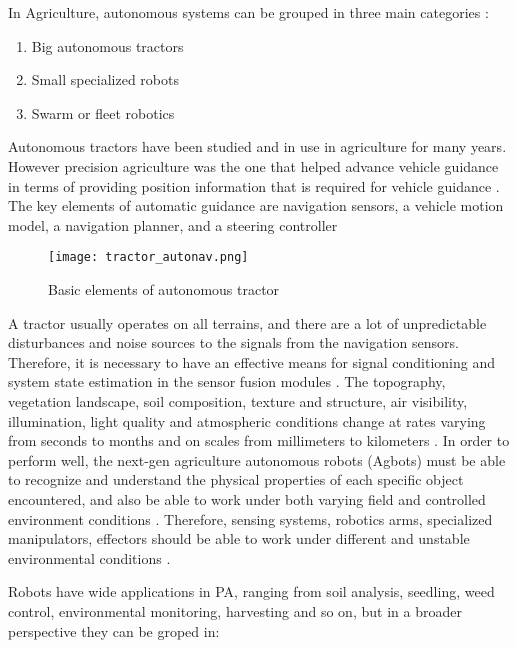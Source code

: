 \documentclass[review]{elsarticle}
\begin{document}
    In Agriculture, autonomous systems can be grouped in three main categories \cite{Emmi_2014}:
    \begin{enumerate}
        \item Big autonomous tractors
        \item Small specialized robots
        \item Swarm or fleet robotics
    \end{enumerate}

    Autonomous tractors have been studied and in use in agriculture for many years. However precision agriculture was the one that helped advance vehicle guidance in terms of providing position information that is required for vehicle guidance \cite{Reid_2000}. The key elements of automatic guidance are navigation sensors, a vehicle motion model, a navigation planner, and a steering controller

    \begin{figure}[thpb]
        \centering
        \texttt{[image: tractor\_autonav.png]}
        \caption{Basic elements of autonomous tractor}
        \label{fig:auto_navv}
    \end{figure}

    A tractor usually operates on all terrains, and there are a lot of unpredictable disturbances and noise sources to the signals from the navigation sensors. Therefore, it is necessary to have an effective means for signal conditioning and system state estimation in the sensor fusion modules \cite{Noguchi_2001}. The topography, vegetation landscape, soil composition, texture and structure, air visibility, illumination, light quality and atmospheric conditions change at rates varying from seconds to months and on scales from millimeters to kilometers \cite{Bechar_2016}. In order to perform well, the next-gen agriculture autonomous robots (Agbots) must be able to recognize and understand the physical properties of each specific object encountered, and also be able to work under both varying field and controlled environment conditions \cite{Eizicovits_2014}. Therefore, sensing systems, robotics arms, specialized manipulators, effectors should be able to work under different and unstable environmental conditions \cite{Bechar_2017}.

    Robots have wide applications in PA, ranging from soil analysis, seedling, weed control, environmental monitoring, harvesting and so on, but in a broader perspective they can be groped in:
\end{document}

